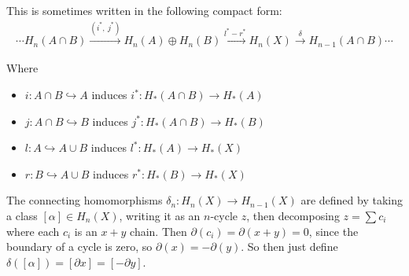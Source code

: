 \begin{center}
\end{center}

This is sometimes written in the following compact form:
\begin{align*} \cdots  H_n(A \cap B) \xrightarrow{(i^*,~ j^*)} H_n(A) \oplus H_n(B) \xrightarrow{l^* - r^*}  H_n(X) \xrightarrow{\delta} H_{n-1}(A\cap B)\cdots\end{align*}

Where

\begin{itemize}
\item
  \(i: A\cap B \hookrightarrow A\) induces
  \(i^*: H_*(A\cap B) \to H_*(A)\)
\item
  \(j: A\cap B \hookrightarrow B\) induces
  \(j^*: H_*(A\cap B) \to H_*(B)\)
\item
  \(l: A \hookrightarrow A\cup B\) induces \(l^*: H_*(A) \to H_*(X)\)
\item
  \(r: B \hookrightarrow A\cup B\) induces \(r^*: H_*(B) \to H_*(X)\)
\end{itemize}

The connecting homomorphisms \(\delta_n :H_n(X) \to H_{n-1}(X)\) are
defined by taking a class \([\alpha] \in H_n(X)\), writing it as an
\(n\)-cycle \(z\), then decomposing \(z = \sum c_i\) where each \(c_i\)
is an \(x+y\) chain. Then \({\partial}(c_i) = {\partial}(x+y) = 0\),
since the boundary of a cycle is zero, so
\({\partial}(x) = -{\partial}(y)\). So then just define
\(\delta([\alpha]) = [{\partial}x] = [-{\partial}y]\).

